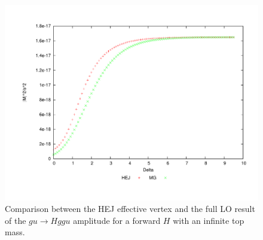 \begin{figure}[H]
\centering
\includegraphics[scale=0.5]{Images/ug_nextfor.pdf}
\caption{Comparison between the HEJ effective vertex and the full LO result of the $gu \to Hggu$ amplitude for a forward $H$ with an infinite top mass.}
\label{fig:ug_for} 
\end{figure}

